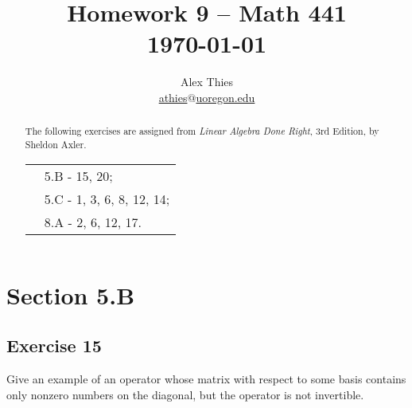 \documentclass[letterpaper, 12pt]{amsart}
\theoremstyle{definition}  							%
\begin{document}
	\title{Homework 9  -- Math 441 \\ \today}
	\author{Alex Thies \\ \href{mailto:athies@uoregon.edu}{\lowercase{athies$@$uoregon.edu}}}

	\begin{abstract}
	The following exercises are assigned from \textit{Linear Algebra Done Right}, 3rd Edition, by Sheldon Axler. 
			\begin{tabular}{rl}
				& 5.B - 15, 20; \\
				& 5.C - 1, 3, 6, 8, 12, 14; \\
				& 8.A - 2, 6, 12, 17.
			\end{tabular}
	\end{abstract}

	\maketitle

	\section*{Section 5.B}
		\subsection*{Exercise 15}
		Give an example of an operator whose matrix with respect to some basis contains only nonzero numbers on the diagonal, but the operator is not invertible.
		\vspace*{3mm}
\end{document}
